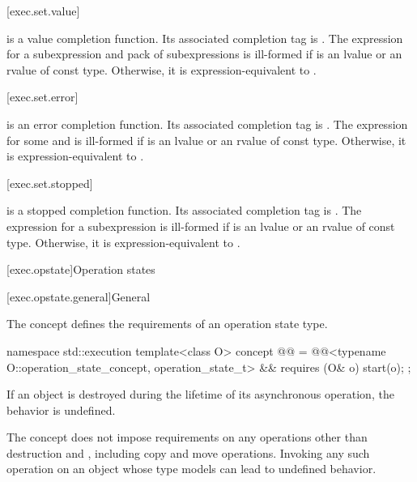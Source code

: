 [exec.set.value]{}

\pnum
{} is a value completion function.
Its associated completion tag is .
The expression 
for a subexpression  and
pack of subexpressions  is ill-formed
if  is an lvalue or an rvalue of const type.
Otherwise, it is expression-equivalent to
.

[exec.set.error]{}

\pnum
{} is an error completion function.
Its associated completion tag is .
The expression 
for some   and  is ill-formed
if  is an lvalue or an rvalue of const type.
Otherwise, it is expression-equivalent to
.

[exec.set.stopped]{}

\pnum
{} is a stopped completion function.
Its associated completion tag is .
The expression 
for a subexpression  is ill-formed
if  is an lvalue or an rvalue of const type.
Otherwise, it is expression-equivalent to
.

[exec.opstate]{Operation states}

[exec.opstate.general]{General}

\pnum
The  concept defines
the requirements of an operation state type.
\begin{codeblock}
namespace std::execution {
  template<class O>
    concept @@ =
      @@<typename O::operation_state_concept, operation_state_t> &&
      requires (O& o) {
        start(o);
      };
}
\end{codeblock}

\pnum
If an  object is destroyed
during the lifetime of its asynchronous operation,
the behavior is undefined.
\begin{note}
The  concept does not impose requirements
on any operations other than destruction and ,
including copy and move operations.
Invoking any such operation on an object
whose type models  can lead to undefined behavior.
\end{note}

